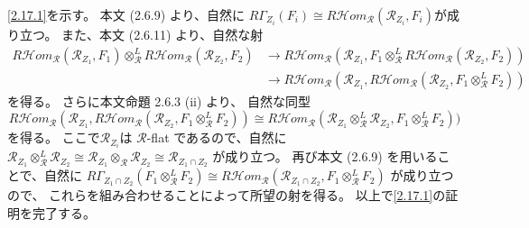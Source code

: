 \documentclass[uplatex,dvipdfmx]{jsarticle}
\makeatletter
\theoremstyle{definition}
\renewenvironment{proof}[1][\proofname]{
  \pushQED{\qed}%
  \normalfont \topsep6\p@\@plus6\p@\relax
  \trivlist
  \item[\hskip\labelsep
    #1\@addpunct{\textbf{.}}]\ignorespaces
}{%
  \popQED\endtrivlist\@endpefalse
}
\providecommand{\proofname}{証明}
\newcommand{\inHom}{\mathcal{H}om}
\newcommand\mcR{\mathcal{R}}
\makeatother
\begin{document}
\begin{proof}
  \ref{2.17.1}を示す。
  本文 (2.6.9) より、自然に
  \(R\Gamma_{Z_i}(F_i) \cong R\inHom_{\mcR}(\mcR_{Z_i},F_i)\)が成り立つ。
  また、本文 (2.6.11) より、自然な射
  \begin{align*}
    R\inHom_{\mcR}(\mcR_{Z_1},F_1) \otimes_{\mcR}^L R\inHom_{\mcR}(\mcR_{Z_2},F_2)
    &\to R\inHom_{\mcR}(\mcR_{Z_1},F_1\otimes_{\mcR}^L R\inHom_{\mcR}(\mcR_{Z_2},F_2)) \\
    &\to R\inHom_{\mcR}(\mcR_{Z_1},R\inHom_{\mcR}(\mcR_{Z_2},F_1\otimes_{\mcR}^L F_2))
  \end{align*}
  を得る。
  さらに本文命題 2.6.3 (ii) より、
  自然な同型
  \[
  R\inHom_{\mcR}(\mcR_{Z_1},R\inHom_{\mcR}(\mcR_{Z_2},F_1\otimes_{\mcR}^L F_2))
  \cong R\inHom_{\mcR}(\mcR_{Z_1}\otimes_{\mcR}^L \mcR_{Z_2},F_1\otimes_{\mcR}^L F_2))
  \]
  を得る。
  ここで\(\mcR_{Z_i}\)は \(\mcR\)-flat であるので、自然に
  \(\mcR_{Z_1}\otimes_{\mcR}^L \mcR_{Z_2} \cong
  \mcR_{Z_1}\otimes_{\mcR} \mcR_{Z_2} \cong \mcR_{Z_1\cap Z_2}\)
  が成り立つ。
  再び本文 (2.6.9) を用いることで、自然に
  \(R\Gamma_{Z_1\cap Z_2}(F_1\otimes_{\mcR}^L F_2) \cong
  R\inHom_{\mcR}(\mcR_{Z_1\cap Z_2},F_1\otimes_{\mcR}^L F_2)\)
  が成り立つので、
  これらを組み合わせることによって所望の射を得る。
  以上で\ref{2.17.1}の証明を完了する。


\end{proof}
\end{document}

